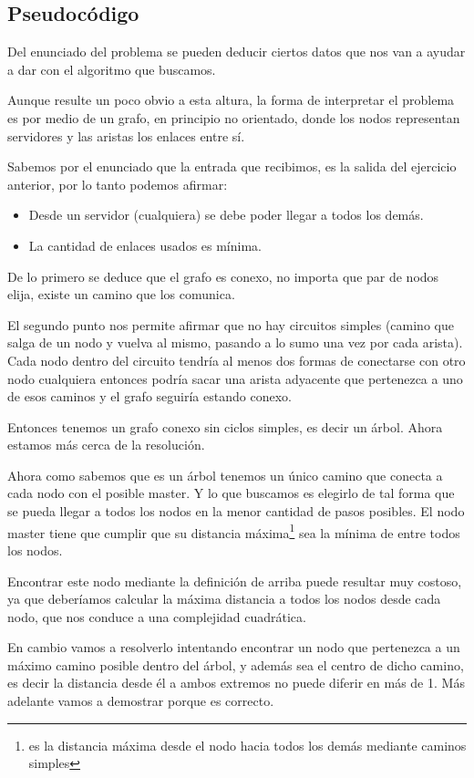 \subsection{Pseudocódigo}

Del enunciado del problema se pueden deducir ciertos datos que nos van a ayudar a dar con el algoritmo que buscamos.

Aunque resulte un poco obvio a esta altura, la forma de interpretar el problema es por medio de un grafo, en principio no orientado, donde los nodos representan servidores y las aristas los enlaces entre sí.

Sabemos por el enunciado que la entrada que recibimos, es la salida del ejercicio anterior, por lo tanto podemos afirmar:

\begin{itemize}
\item Desde un servidor (cualquiera) se debe poder llegar a todos los demás.
\item La cantidad de enlaces usados es mínima.
\end{itemize}

De lo primero se deduce que el grafo es conexo, no importa que par de nodos elija, existe un camino que los comunica.

El segundo punto nos permite afirmar que no hay circuitos simples (camino que salga de un nodo y vuelva al mismo, pasando a lo sumo una vez por cada arista). Cada nodo dentro del circuito tendría al menos dos formas de conectarse con otro nodo cualquiera   entonces podría sacar una arista adyacente que pertenezca a uno de esos caminos y el grafo seguiría estando conexo.

Entonces tenemos un grafo conexo sin ciclos simples, es decir un árbol. Ahora estamos más cerca de la resolución.

Ahora como sabemos que es un árbol tenemos un único camino que conecta a cada nodo con el posible master. Y lo que buscamos es elegirlo de tal forma que se pueda llegar a todos los nodos en la menor cantidad de pasos posibles. El nodo master tiene que cumplir que su distancia máxima\footnote{es la distancia máxima desde el nodo hacia todos los demás mediante caminos simples} sea la mínima de entre todos los nodos.

Encontrar este nodo mediante la definición de arriba puede resultar muy costoso, ya que deberíamos calcular la máxima distancia a todos los nodos desde cada nodo, que nos conduce a una complejidad cuadrática.

En cambio vamos a resolverlo intentando encontrar un nodo que pertenezca a un máximo camino posible dentro del árbol, y además sea el centro de dicho camino, es decir la distancia desde él a ambos extremos no puede diferir en más de 1. Más adelante vamos a demostrar porque es correcto.

